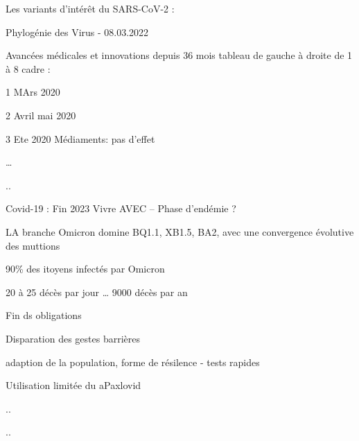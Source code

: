 \documentclass[
  ignorenonframetext,
]{beamer}
\begin{document}
\begin{frame}{Les variants d'intérêt du SARS-CoV-2 :}
\protect\hypertarget{les-variants-dintuxe9ruxeat-du-sars-cov-2}{}
\begin{block}{Phylogénie des Virus - 08.03.2022}
\protect\hypertarget{phyloguxe9nie-des-virus---08.03.2022}{}
\end{block}
\end{frame}

\begin{frame}{Avancées médicales et innovations depuis 36 mois}
\protect\hypertarget{avancuxe9es-muxe9dicales-et-innovations-depuis-36-mois}{}
tableau de gauche à droite de 1 à 8 cadre :

1 MArs 2020

2 Avril mai 2020

3 Ete 2020 Médiaments: pas d'effet

\ldots{}

..
\end{frame}

\begin{frame}{Covid-19 : Fin 2023}
\protect\hypertarget{covid-19-fin-2023}{}
Vivre AVEC -- Phase d'endémie ?

LA branche Omicron domine BQ1.1, XB1.5, BA2, avec une convergence
évolutive des muttions

90\% des itoyens infectés par Omicron

20 à 25 décès par jour \ldots{} 9000 décès par an

Fin ds obligations

Disparation des gestes barrières

adaption de la population, forme de résilence - tests rapides

Utilisation limitée du aPaxlovid

..

..
\end{frame}
\end{document}
